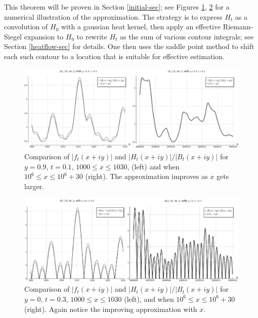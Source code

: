 This theorem will be proven in Section \ref{initial-sec}; see Figures \ref{htft}, \ref{htft-2} for a numerical illustration of the approximation.  The strategy is to express $H_t$ as a convolution of $H_0$ with a gaussian heat kernel, then apply an effective Riemann-Siegel expansion to $H_0$ to rewrite $H_t$ as the sum of various contour integrals; see Section \ref{heatflow-sec} for details.  One then uses the saddle point method to shift each such contour to a location that is suitable for effective estimation. 

\begin{figure}[h!]
  \includegraphics[width=\linewidth]{ft_vs_HtdivBt_y_09.png}
  \caption{Comparison of $|f_t(x+iy)|$ and $|H_t(x+iy)|/|B_t(x+iy)|$ for $y=0.9$, $t=0.1$, $1000 \leq x \leq 1030$, (left) and when $10^6 \leq x \leq 10^6 + 30$ (right). The approximation improves as $x$ gets larger.}
	\label{htft}
\end{figure}

\begin{figure}[h!]
  \includegraphics[width=\linewidth]{ft_vs_HtdivBt_y_0.png}
  \caption{Comparison of $|f_t(x+iy)|$ and $|H_t(x+iy)|/|B_t(x+iy)|$ for $y=0$, $t=0.3$, $1000 \leq x \leq 1030$ (left), and when $10^6 \leq x \leq 10^6 + 30$ (right). Again notice the improving approximation with $x$.}
	\label{htft-2}
\end{figure}

